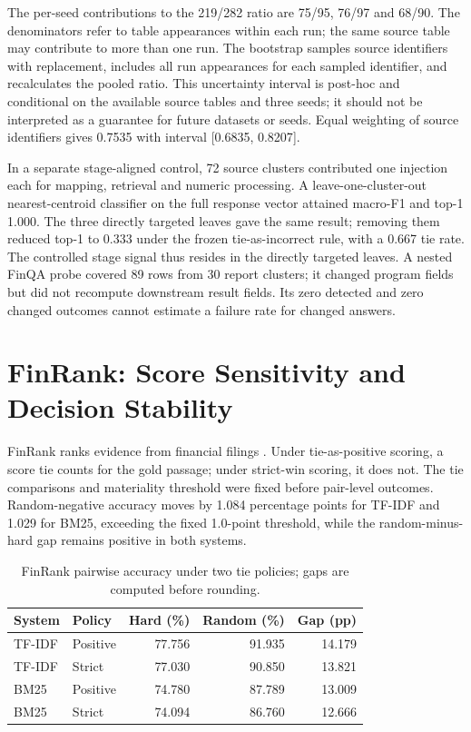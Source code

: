 \documentclass[conference]{IEEEtran}
\begin{document}
The per-seed contributions to the 219/282 ratio are 75/95, 76/97 and
68/90. The denominators refer to table appearances within each run; the
same source table may contribute to more than one run. The bootstrap
samples source identifiers with replacement, includes all run
appearances for each sampled identifier, and recalculates the pooled
ratio. This uncertainty interval is post-hoc and conditional on the
available source tables and three seeds; it should not be interpreted as
a guarantee for future datasets or seeds. Equal weighting of source
identifiers gives 0.7535 with interval {[}0.6835, 0.8207{]}.

In a separate stage-aligned control, 72 source clusters contributed one
injection each for mapping, retrieval and numeric processing. A
leave-one-cluster-out nearest-centroid classifier on the full response
vector attained macro-F1 and top-1 1.000. The three directly targeted
leaves gave the same result; removing them reduced top-1 to 0.333 under
the frozen tie-as-incorrect rule, with a 0.667 tie rate. The controlled
stage signal thus resides in the directly targeted leaves. A nested
FinQA probe \cite{r10} covered 89 rows from 30 report clusters; it
changed program fields but did not recompute downstream result fields.
Its zero detected and zero changed outcomes cannot estimate a failure
rate for changed answers.

\section{FinRank: Score Sensitivity and Decision
Stability}\label{finrank-score-sensitivity-and-decision-stability}

FinRank ranks evidence from financial filings \cite{r1}. Under
tie-as-positive scoring, a score tie counts for the gold passage; under
strict-win scoring, it does not. The tie comparisons and materiality
threshold were fixed before pair-level outcomes. Random-negative
accuracy moves by 1.084 percentage points for TF-IDF and 1.029 for BM25,
exceeding the fixed 1.0-point threshold, while the random-minus-hard gap
remains positive in both systems.

\begin{table}[htbp]
\caption{FinRank pairwise accuracy under two tie policies; gaps are computed before rounding.}
\label{tab:finrank}
\centering
\begin{tabular}{llrrr}
\hline
System & Policy & Hard (\%) & Random (\%) & Gap (pp) \\
\hline
TF-IDF & Positive & 77.756 & 91.935 & 14.179 \\
TF-IDF & Strict & 77.030 & 90.850 & 13.821 \\
BM25 & Positive & 74.780 & 87.789 & 13.009 \\
BM25 & Strict & 74.094 & 86.760 & 12.666 \\
\hline
\end{tabular}
\end{table}
\end{document}

